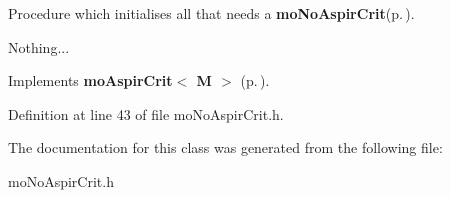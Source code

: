 Procedure which initialises all that needs a {\bf mo\-No\-Aspir\-Crit}{\rm (p.\,\pageref{classmo_no_aspir_crit})}. 

Nothing... 

Implements {\bf mo\-Aspir\-Crit$<$ M $>$} {\rm (p.\,\pageref{classmo_aspir_crit_a8ce84510a5ec7c9078381e542c6d140})}.

Definition at line 43 of file mo\-No\-Aspir\-Crit.h.

The documentation for this class was generated from the following file:\begin{CompactItemize}
\item 
mo\-No\-Aspir\-Crit.h\end{CompactItemize}
